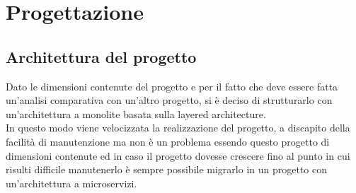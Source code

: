 
\chapter{Progettazione}
\label{cap:progettazione}


\section{Architettura del progetto}
Dato le dimensioni contenute del progetto e per il fatto che deve essere fatta un'analisi 
comparativa con un'altro progetto, si è deciso di strutturarlo con un'architettura a monolite
basata sulla layered architecture.
\\
In questo modo viene velocizzata la realizzazione del progetto, a discapito della facilità di
manutenzione ma non è un problema essendo questo progetto di dimensioni contenute ed in caso
il progetto dovesse crescere fino al punto in cui risulti difficile manutenerlo è sempre possibile
migrarlo in un progetto con un'architettura a microservizi.

